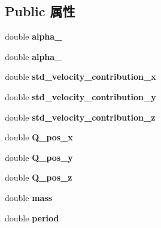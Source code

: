 \subsection*{Public 属性}
\begin{DoxyCompactItemize}
\item 
\mbox{\label{classKalmanFilterForVE_a13f36667fd13adc9df140afc721b2471}} 
double {\bfseries alpha\+\_}
\item 
\mbox{\label{classKalmanFilterForVE_a940483cf6d541154c5a75766eeb3e4f9}} 
double {\bfseries alpha\+\_}
\item 
\mbox{\label{classKalmanFilterForVE_ae5aee1d62ed0103ea0f14ae60cd149bb}} 
double {\bfseries std\+\_\+velocity\+\_\+contribution\+\_\+x}
\item 
\mbox{\label{classKalmanFilterForVE_af4eb61437404079e177cfc65e2031efb}} 
double {\bfseries std\+\_\+velocity\+\_\+contribution\+\_\+y}
\item 
\mbox{\label{classKalmanFilterForVE_a1ca261dbf3a3ef0d6800e0226a3e4625}} 
double {\bfseries std\+\_\+velocity\+\_\+contribution\+\_\+z}
\item 
\mbox{\label{classKalmanFilterForVE_acd7508d05dc989a70c0157bb5784d782}} 
double {\bfseries Q\+\_\+pos\+\_\+x}
\item 
\mbox{\label{classKalmanFilterForVE_a33e297573da7d7ad4081a14bc7711239}} 
double {\bfseries Q\+\_\+pos\+\_\+y}
\item 
\mbox{\label{classKalmanFilterForVE_afbc45d59caf3fbdc3e5cb2f754014db4}} 
double {\bfseries Q\+\_\+pos\+\_\+z}
\item 
\mbox{\label{classKalmanFilterForVE_a92ef545ae33155598cd27fb0d0337fab}} 
double {\bfseries mass}
\item 
\mbox{\label{classKalmanFilterForVE_a68abba388cb8e515b4aa4b91ee0841c9}} 
double {\bfseries period}
\item 

\end{DoxyCompactItemize}
